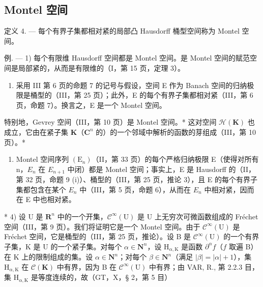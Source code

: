 \subsection{Montel 空间}

定义 4. --- 每个有界子集都相对紧的局部凸 Hausdorff 桶型空间称为 Montel 空间。

例. --- 1) 每个有限维 Hausdorff 空间都是 Montel 空间。是 Montel 空间的赋范空间是局部紧的，从而是有限维的（I，第 15 页，定理 3）。

\begin{enumerate}
\def\labelenumi{\arabic{enumi})}
\setcounter{enumi}{1}
\tightlist
\item
  采用 III 第 6 页的命题 7 的记号与假设，空间 E 作为 Banach 空间的归纳极限是桶型的（III，第 25 页）；此外，E 的每个有界子集都相对紧（III，第 6 页，命题 7）。换言之，E 是一个 Montel 空间。
\end{enumerate}

特别地，Gevrey 空间（III，第 10 页）是 Montel 空间。* 这对空间 \(\mathcal{H}(\mathbf{K})\) 也成立，它由在紧子集 \(\mathbf{K}\)（\(\mathbf{C}^n\) 的）的一个邻域中解析的函数的芽组成（III，第 10 页）。*

\begin{enumerate}
\def\labelenumi{\arabic{enumi})}
\setcounter{enumi}{2}
\tightlist
\item
  Montel 空间序列 \((\mathrm{E}_{n})\)（II，第 33 页）的每个严格归纳极限 E（使得对所有 n，\(E_{n}\) 在 \(E_{n+1}\) 中闭）都是 Montel 空间；事实上，E 是 Hausdorff 的（II，第 32 页，命题 9 (i)）、桶型的（III，第 25 页，推论 3），且 E 的每个有界子集都包含在某个 \(E_{n}\) 中（III，第 5 页，命题 6），从而在 \(E_{n}\) 中相对紧，因而在 E 中也相对紧。
\end{enumerate}

* 4) 设 U 是 \(\mathbf{R}^n\) 中的一个开集，\(\mathcal{C}^\infty (\mathrm{U})\) 是 U 上无穷次可微函数组成的 Fréchet 空间（III，第 9 页）。我们将证明它是一个 Montel 空间。由于 \(\mathcal{C}^\infty (\mathrm{U})\) 是 Fréchet 空间，它是桶型的（III，第 25 页，推论）。设 B 是 \(\mathcal{C}^\infty (\mathrm{U})\) 的一个有界子集，K 是 U 的一个紧子集。对每个 \(\alpha \in \mathbf{N}^n\)，设 \(\mathrm{H}_{\alpha ,\mathrm{K}}\) 是函数 \(\partial^{\alpha}f\)（\(f\) 取遍 B）在 K 上的限制组成的集。设 \(\alpha \in \mathbf{N}^n\)；对每个 \(\beta \in \mathbf{N}^n\)（满足 \(|\beta | = |\alpha | + 1\)），集 \(\mathrm{H}_{\alpha ,\mathrm{K}}\) 在 \(\mathcal{C}(\mathbf{K})\) 中有界，因为 B 在 \(\mathcal{C}^\infty (\mathrm{U})\) 中有界；由 VAR, R., 第 2.2.3 目，集 \(\mathrm{H}_{\alpha ,\mathrm{K}}\) 是等度连续的，故（GT，X，§ 2，第 5 目）

